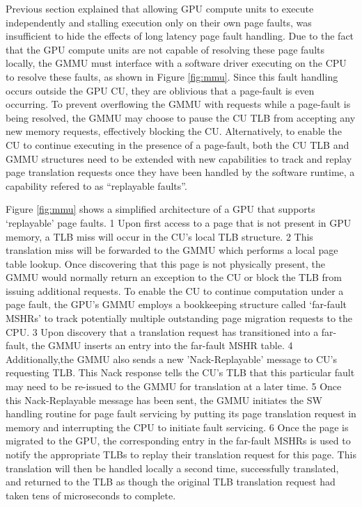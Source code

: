 Previous section explained that allowing GPU compute units to execute independently and stalling execution only on their own page faults, was insufficient to hide the effects of long latency page fault handling. Due to the fact that the GPU compute units are not capable of resolving these page faults locally, the GMMU must interface with a software driver executing on the CPU to resolve these faults, as shown in Figure \ref{fig:mmu}. Since this fault handling occurs outside the GPU CU, they are oblivious that a page-fault is even occurring. To prevent overflowing the GMMU with requests while a page-fault is being resolved, the GMMU may choose to pause the CU TLB from accepting any new memory requests, effectively blocking the CU. Alternatively, to enable the CU to continue executing in the presence of a page-fault, both the CU TLB and GMMU structures need to be extended with new capabilities to track and replay page translation requests once they have been handled by the software runtime, a capability refered to as “replayable faults”. 

Figure \ref{fig:mmu} shows a simplified architecture of a GPU that supports ‘replayable’ page faults. \textcircled{\small{1}} Upon first access to a page that is not present in GPU memory, a TLB miss will occur in the CU’s local TLB structure. \textcircled{\small{2}} This translation miss will be forwarded to the GMMU which performs a local page table lookup. Once discovering that this page is not physically present, the GMMU would normally return an exception to the CU or block the TLB from issuing additional requests. To enable the CU to continue computation under a page fault, the GPU’s GMMU employs a bookkeeping structure called ‘far-fault MSHRs’ to track potentially multiple outstanding page migration requests to the CPU. \textcircled{\small{3}} Upon discovery that a translation request has transitioned into a far-fault, the GMMU inserts an entry into the far-fault MSHR table. \textcircled{\small{4}} Additionally,the GMMU also sends a new ’Nack-Replayable’ message to CU’s requesting TLB. This Nack response tells the CU’s TLB that this particular fault may need to be re-issued to the GMMU for translation at a later time. \textcircled{\small{5}} Once this Nack-Replayable message has been sent, the GMMU initiates the SW handling routine for page fault servicing by putting its page translation request in memory and interrupting the CPU to initiate fault servicing. \textcircled{\small{6}} Once the page is migrated to the GPU, the corresponding entry in the far-fault MSHRs is used to notify the appropriate TLBs to replay their translation request for this page. This translation will then be handled locally a second time, successfully translated, and returned to the TLB as though the original TLB translation request had taken tens of microseconds to complete.

